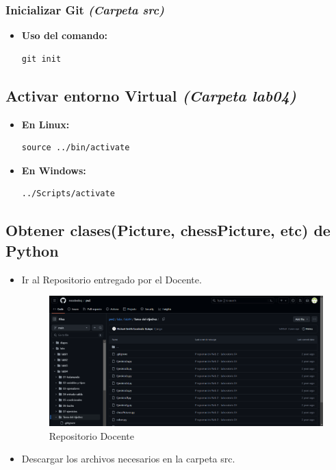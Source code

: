 \documentclass{article}
\begin{document}

  \subsubsection{Inicializar Git \textit{(Carpeta src)}}
  \begin{itemize}
    \item \textbf{Uso del comando:}
    \begin{lstlisting}[language={}]
        git init
    \end{lstlisting}
  \end{itemize}
  

  \subsection{Activar entorno Virtual \textit{(Carpeta lab04)}}
  \begin{itemize}
    \item \textbf{En Linux:}
    \begin{lstlisting}[language={}]
      source ../bin/activate
    \end{lstlisting}
    \item \textbf{En Windows:}
    \begin{lstlisting}[language={}]
      ../Scripts/activate
    \end{lstlisting}
  \end{itemize}
  
  
  \subsection{Obtener clases(Picture, chessPicture, etc) de Python}
  \begin{itemize}
    \item Ir al Repositorio entregado por el Docente.
    \begin{figure}[H]
      \centering
      \includegraphics[width=1\textwidth, keepaspectratio]{img/repoDocente.png}
      \caption{Repositorio Docente}
    \end{figure}
    \item Descargar los archivos necesarios en la carpeta src.
  \end{itemize}
  \newpage
  
\end{document}
